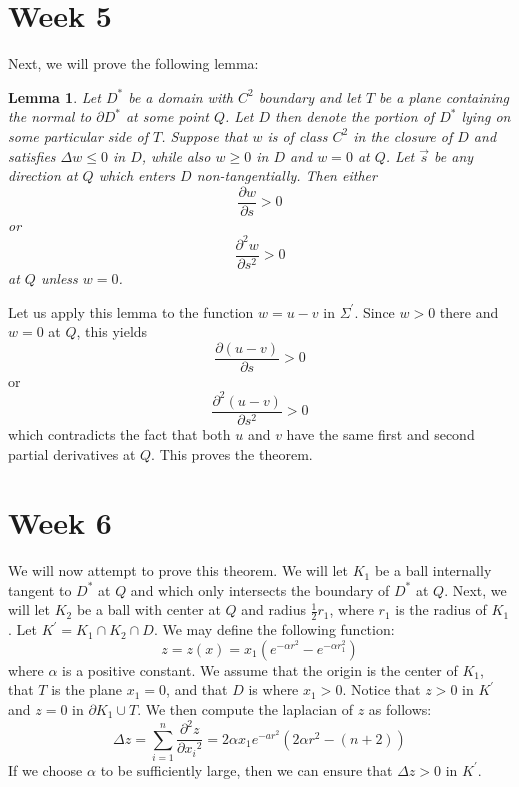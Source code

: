 \documentclass[12pt]{article}
\newtheorem{lemma}{Lemma}
\begin{document}
\section*{Week 5}
Next, we will prove the following lemma:
\begin{lemma}
Let $D^*$ be a domain with $C^2$ boundary and let $T$ be a plane containing the normal to $\partial{D^*}$ at some point $Q$. Let $D$ then denote the portion of $D^*$ lying on some particular side of $T$. Suppose that $w$ is of class $C^2$ in the closure of $D$ and satisfies $\Delta w \leq 0$ in $D$, while also $w \geq 0$ in $D$ and $w = 0$ at $Q$. Let $\vec{s}$ be any direction at $Q$ which enters $D$ non-tangentially. Then either
\[
\frac{\partial{w}}{\partial{s}} > 0
\] or 
\[
\frac{\partial^2{w}}{\partial{s}^2} > 0
\] at $Q$ unless $w = 0$.
\end{lemma} Let us apply this lemma to the function $w = u - v$ in $\Sigma^\prime$. Since $w > 0$ there and $w = 0$ at $Q$, this yields
\[
\frac{\partial{(u-v)}}{\partial{s}} > 0
\] or
\[
\frac{\partial^2{(u-v)}}{\partial{s}^2} > 0
\] which contradicts the fact that both $u$ and $v$ have the same first and second partial derivatives at $Q$. This proves the theorem.
\section*{Week 6}
We will now attempt to prove this theorem. We will let $K_1$ be a ball internally tangent to $D^*$ at $Q$ and which only intersects the boundary of $D^*$ at $Q$. Next, we will let $K_2$ be a ball with center at $Q$ and radius $\frac{1}{2}r_1$, where $r_1$ is the radius of $K_1$. Let $K^\prime = K_1 \cap K_2 \cap D$. We may define the following function:
\[
z = z(x) = x_1(e^{-\alpha r^2} - e^{-\alpha r_1^2})
\] where $\alpha$ is a positive constant. We assume that the origin is the center of $K_1$, that $T$ is the plane $x_1 = 0$, and that $D$ is where $x_1 > 0$. Notice that $z > 0$ in $K^\prime$ and $z = 0$ in $\partial{K_1} \cup T$. We then compute the laplacian of $z$ as follows:
\[
\Delta z = \sum_{i=1}^n \frac{\partial^2{z}}{\partial{x_i}^2} = 2\alpha x_1 e^{-ar^2} (2\alpha r^2 - (n+2))
\] If we choose $\alpha$ to be sufficiently large, then we can ensure that $\Delta z > 0$ in $K^\prime$.
\end{document}
